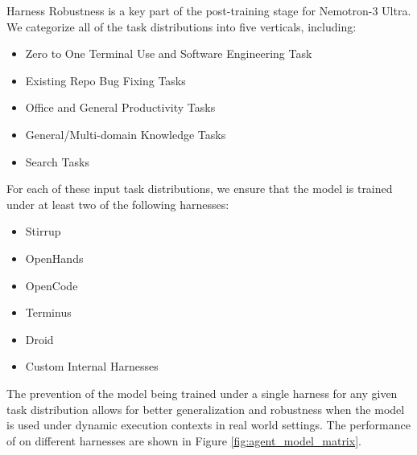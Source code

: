 Harness Robustness is a key part of the post-training stage for Nemotron-3 Ultra. We categorize all of the task distributions into five verticals, including:
\begin{itemize}
    \item Zero to One Terminal Use and Software Engineering Task
    \item Existing Repo Bug Fixing Tasks
    \item Office and General Productivity Tasks
    \item General/Multi-domain Knowledge Tasks
    \item Search Tasks
\end{itemize}

For each of these input task distributions, we ensure that the model is trained under at least two of the following harnesses:
\begin{itemize}
    \item Stirrup
    \item OpenHands
    \item OpenCode
    \item Terminus
    \item Droid
    \item Custom Internal Harnesses
\end{itemize}

The prevention of the model being trained under a single harness for any given task distribution allows for better generalization and robustness when the model is used under dynamic execution contexts in real world settings. The performance of \ourmodel on different harnesses are shown in Figure \ref{fig:agent_model_matrix}.


